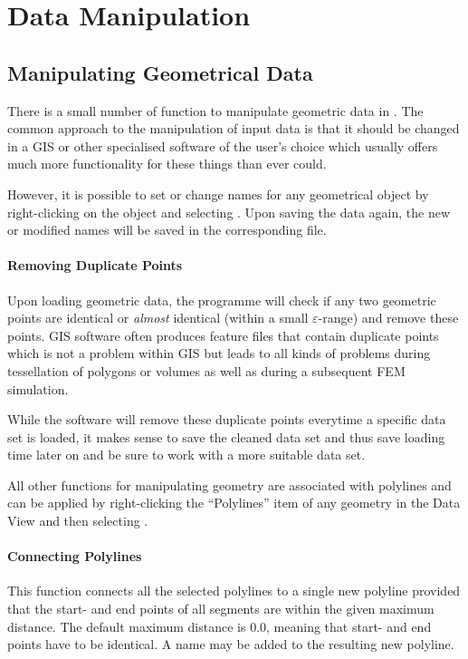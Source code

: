 \chapter{Data Manipulation}

\section{Manipulating Geometrical Data}

There is a small number of function to manipulate geometric data in \ogs. The common approach to the manipulation of \ogs input data is that it should be changed in a GIS or other specialised software of the user's choice which usually offers much more functionality for these things than \ogs ever could.

However, it is possible to set or change names for any geometrical object by right-clicking on the object and selecting . Upon saving the data again, the new or modified names will be saved in the corresponding file.

\subsubsection{Removing Duplicate Points}

Upon loading geometric data, the programme will check if any two geometric points are identical or \emph{almost} identical (within a small $\varepsilon$-range) and remove these points. GIS software often produces feature files that contain duplicate points which is not a problem within GIS but leads to all kinds of problems during tessellation of polygons or volumes as well as during a subsequent FEM simulation.

While the software will remove these duplicate points everytime a specific data set is loaded, it makes sense to save the cleaned data set and thus save loading time later on and be sure to work with a more suitable data set.

\bigskip

All other functions for manipulating geometry are associated with polylines and can be applied by right-clicking the ``Polylines'' item of any geometry in the Data View and then selecting .

\subsubsection{Connecting Polylines}
This function connects all the selected polylines to a single new polyline provided that the start- and end points of all segments are within the given maximum distance. The default maximum distance is $0.0$, meaning that start- and end points have to be identical. A name may be added to the resulting new polyline.

